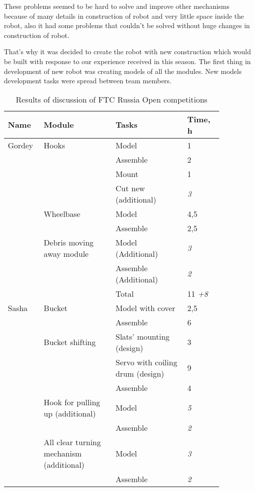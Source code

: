 These problems seemed to be hard to solve and improve other mechanisms because of many details in construction of robot and very little space inside the robot, also it had some problems that couldn't be solved without huge changes in construction of robot. 

That’s why it was decided to create the robot with new construction which would be built with response to our experience received in this season. The first thing in development of new robot was creating models of all the modules. New models development tasks were spread between team members.

\begin{table}[H]
	\caption{Results of discussion of FTC Russia Open competitions}
	\label{tabular:PlanRUS28.02}
	\begin{center}
		\begin{tabular}{|p{0.12\linewidth}|p{0.3\linewidth}|p{0.3\linewidth}|p{0.15\linewidth}|}
			\hline
			Name & Module & Tasks & Time, h \\
			\hline
			Gordey	& Hooks	& Model	& 1 \\
			& & Assemble & 2 \\
			& & Mount & 1 \\
			& & Cut new (additional) & \textit{3} \\
			\hline
			& Wheelbase & Model & 4,5 \\
			& & Assemble	& 2,5 \\
			& Debris moving away module	& Model (Additional)	& \textit{3} \\
			& & Assemble (Additional) & \textit{2} \\
			\hline
			& & Total & 11 \textit{+8} \\
			\hline 
			\hline
			Sasha & Bucket	& Model with cover	& 2,5 \\
			& & Assemble & 6 \\
			\hline
			& Bucket shifting & Slats' mounting (design) & 3 \\
			& & Servo with coiling drum (design)	& 9 \\   
			& & Assemble	& 4 \\                                
			\hline
			& Hook for pulling up (additional)	& Model	& \textit{5} \\              
			& & Assemble	& \textit{2}\\          
			& All clear turning mechanism (additional) & Model & \textit{3}\\       
			& & Assemble	& \textit{2} \\

\end{tabular}
\end{center}
\end{table}
